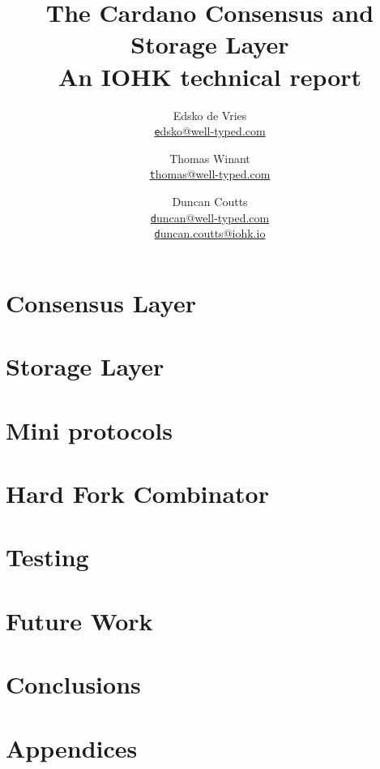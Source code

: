 \documentclass[11pt,a4paper]{report}
\title{The Cardano Consensus and Storage Layer \\
       {\large \sc An IOHK technical report}
  }
\author{Edsko de Vries \\ \href{mailto:edsko@well-typed.com}
                               {\small \texttt edsko@well-typed.com}
   \and Thomas Winant  \\ \href{mailto:thomas@well-typed.com}
                               {\small \texttt thomas@well-typed.com}
   \and Duncan Coutts  \\ \href{mailto:duncan@well-typed.com}
                               {\small \texttt duncan@well-typed.com}
                       \\ \href{mailto:duncan.coutts@iohk.io}
                               {\small \texttt duncan.coutts@iohk.io}
  }
\theoremstyle{definition}
\numberwithin{property}{chapter}
\numberwithin{definition}{chapter}
\numberwithin{lemma}{chapter}
\numberwithin{assumption}{chapter}
\numberwithin{corollary}{chapter}
\numberwithin{proposal}{chapter}
\begin{document}
\maketitle

\tableofcontents





\part{Consensus Layer}




\part{Storage Layer}









\part{Mini protocols}




\part{Hard Fork Combinator}





\part{Testing}




\part{Future Work}






\part{Conclusions}




\part{Appendices}
\appendix






\end{document}
